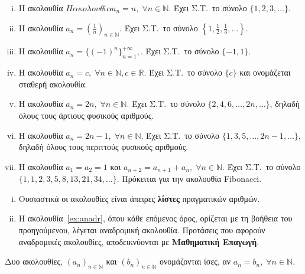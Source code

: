 \documentclass[a4paper,table]{report}
\begin{document}
\begin{examples}
\item {}
  \begin{enumerate}[i)]
    \item Η ακολουθία $ Η ακολουθία a_{n} = n, \; \forall n \in \mathbb{N} $. 
      Έχει Σ.Τ.\  το σύνολο $  \{ 1,2,3, \ldots \} $.
    \item Η ακολουθία $ a_{n}=\left(\frac{1}{n}\right)_{n \in \mathbb{N}} $. 
      Έχει Σ.Τ.\ το σύνολο $  \left\{ 1, \frac{1}{2}, \frac{1}{3}, \ldots \right\} $.
    \item Η ακολουθία $ a_{n}= \{(-1)^{n}\}_{n=1}^{+ \infty}, $. Έχει Σ.Τ.\ 
      το σύνολο $ \{ -1,1 \} $.
    \item Η ακολουθία $ a_{n} = c, \; \forall n \in \mathbb{N}, c \in \mathbb{R} $.
      Έχει Σ.Τ.\ το σύνολο $ \{ c \} $ και ονομάζεται 
      \textcolor{Col1}{σταθερή ακολουθία}.
    \item Η ακολουθία $ a_{n}=2n, \; \forall n \in \mathbb{N} $. Έχει Σ.Τ.\ το 
      σύνολο $ \{ 2,4,6, \ldots, 2n, \ldots \} $, δηλαδή όλους τους
      \textcolor{Col1}{άρτιους} φυσικούς αριθμούς.
    \item Η ακολουθία $ a_{n}= 2n-1, \; \forall n \in \mathbb{N} $. Έχει Σ.Τ.\ το 
      σύνολο $ \{ 1,3,5, \ldots, 2n-1, \ldots \} $, δηλαδή όλους τους περιττούς
      φυσικούς αριθμούς.
    \item \label{ex:anadr} Η ακολουθία $ a_{1}= a_{2} = 1 $ και $ a_{n+2}=a_{n+1}
      +a_{n}, \; \forall n \in \mathbb{N}$. Έχει Σ.Τ.\ το σύνολο 
      $ \{ 1,1,2,3,5,8, 13,21,34, \ldots\} $.  Πρόκειται για την 
      \textcolor{Col1}{ακολουθία Fibonacci}. 
  \end{enumerate}
\end{examples}

\begin{rem}
\item {}
  \begin{enumerate}[i)]
    \item Ουσιαστικά οι ακολουθίες είναι άπειρες \textbf{λίστες} πραγματικών αριθμών.
    \item Η ακολουθία~\ref{ex:anadr}, όπου κάθε επόμενος όρος, ορίζεται με 
      τη βοήθεια του προηγούμενου, λέγεται
      \textcolor{Col1}{αναδρομική ακολουθία}.  Προτάσεις που αφορούν 
      αναδρομικές ακολουθίες, αποδεικνύονται με \textbf{Μαθηματική Επαγωγή}.
  \end{enumerate}
\end{rem}

\begin{mybox1}
  \begin{dfn}
    Δυο ακολουθίες, $(a_{n})_{n \in \mathbb{N}}$  και $ (b_{n})_{n \in \mathbb{N}} $ 
    ονομάζονται \textcolor{Col1}{ίσες}, αν 
    $ a_{n} = b_{n}, \; \forall n \in \mathbb{N} $.
  \end{dfn}
\end{mybox1}
\end{document}

